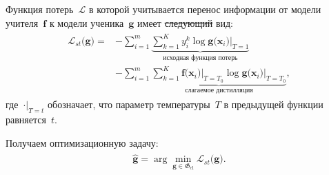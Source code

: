 \documentclass[12pt]{a&t}
\providecommand{\DIFdel}[1]{{\protect\color{red}\sout{#1}}}                      %
\providecommand{\DIFdelbegin}{} %
\providecommand{\DIFdelend}{} %
\newcommand{\DIFscaledelfig}{0.5}
\newlength{\DIFdelgraphicswidth} %
\newlength{\DIFdelgraphicsheight} %
\newcommand{\DIFdelincludegraphics}[2][]{%
\sbox{\DIFdelgraphicsbox}{\DIFOincludegraphics[#1]{#2}}%
\settoboxwidth{\DIFdelgraphicswidth}{\DIFdelgraphicsbox} %
\settoboxtotalheight{\DIFdelgraphicsheight}{\DIFdelgraphicsbox} %
\scalebox{\DIFscaledelfig}{%
\parbox[b]{\DIFdelgraphicswidth}{\usebox{\DIFdelgraphicsbox}\\[-\baselineskip] \rule{\DIFdelgraphicswidth}{0em}}\llap{\resizebox{\DIFdelgraphicswidth}{\DIFdelgraphicsheight}{%
\setlength{\unitlength}{\DIFdelgraphicswidth}%
\begin{picture}(1,1)%
\thicklines\linethickness{2pt} %
{\color[rgb]{1,0,0}\put(0,0){\framebox(1,1){}}}%
{\color[rgb]{1,0,0}\put(0,0){\line( 1,1){1}}}%
{\color[rgb]{1,0,0}\put(0,1){\line(1,-1){1}}}%
\end{picture}%
}\hspace*{3pt}}} %
} %
\DeclareRobustCommand{\DIFdelbegin}{\DIFOdelbegin \let\includegraphics\DIFdelincludegraphics} %
\DeclareRobustCommand{\DIFdelend}{\DIFOaddend \let\includegraphics\DIFOincludegraphics} %
\begin{document}
Функция потерь~$\mathcal{L}$ в которой учитывается перенос информации от модели учителя~$\mathbf{f}$ к модели ученика~$\mathbf{g}$ имеет \DIFdelbegin \DIFdel{следующий }\DIFdelend вид:
\begin{gather}
\label{eq:hinton:1}
\begin{aligned}
   \mathcal{L}_{st}\bigr(\mathbf{g}\bigr) = &-\sum_{i=1}^{m}\underbrace{{\sum_{k=1}^{K}y^k_i\log\mathbf{g}\bigr(\mathbf{x}_i\bigr)\bigr|_{T=1}}}_{\text{исходная функция потерь}}\\
   &-\sum_{i=1}^{m}\underbrace{{\sum_{k=1}^{K}\mathbf{f}\bigr(\mathbf{x}_i\bigr)\bigr|_{T=T_0}\log\mathbf{g}\bigr(\mathbf{x}_i\bigr)\bigr|_{T=T_0}}}_{\text{слагаемое дистилляция}},
\end{aligned}
\end{gather}
где~$\cdot\bigr|_{T=t}$ обозначает, что параметр температуры~$T$ в предыдущей функции равняется~$t$.

Получаем оптимизационную задачу:
\begin{gather}
\label{eq:hinton:opt}
\begin{aligned}
   \hat{\mathbf{g}} = \arg\min_{\mathbf{g} \in \mathfrak{G}_{\text{cl}}} \mathcal{L}_{st}\bigr(\mathbf{g}\bigr).
\end{aligned}
\end{gather}
\end{document}
